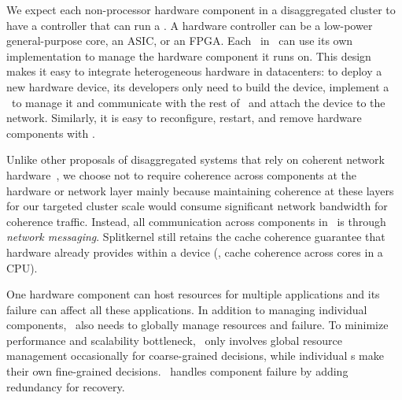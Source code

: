 \documentclass[10pt,times,twocolumn]{z2-article}
\begin{document}
We expect each non-processor hardware component in a disaggregated cluster to have a controller that 
can run a \microos.
A hardware controller can be a low-power general-purpose core, an ASIC, or an FPGA.
Each \microos\ in \splitkernel\ can use its own implementation to manage the hardware component it runs on.
This design makes it easy to integrate heterogeneous hardware in datacenters:
to deploy a new hardware device, its developers only need to build the device,
implement a \microos\ to manage it and communicate with the rest of \splitkernel\,
and attach the device to the network. 
Similarly, it is easy to reconfigure, restart, and remove hardware components with \splitkernel.

Unlike other proposals of disaggregated systems that rely on coherent network hardware~\cite{HP-TheMachine},
we choose not to require coherence across components at the hardware or network layer
mainly because maintaining coherence at these layers for our targeted cluster scale 
would consume significant network bandwidth for coherence traffic.
Instead, all communication across components in \lego\ is through {\em network messaging}.
Splitkernel still retains the cache coherence guarantee that hardware already provides within a device (\eg, cache coherence across cores in a CPU).

One hardware component can host resources for multiple applications and its failure can affect all these applications.
In addition to managing individual components, \splitkernel\ also needs to 
globally manage resources and failure.
To minimize performance and scalability bottleneck,
\splitkernel\ only involves global resource management occasionally for coarse-grained decisions, 
while individual \microos{}s make their own fine-grained decisions.
\splitkernel\ handles component failure by adding redundancy for recovery.
\end{document}
